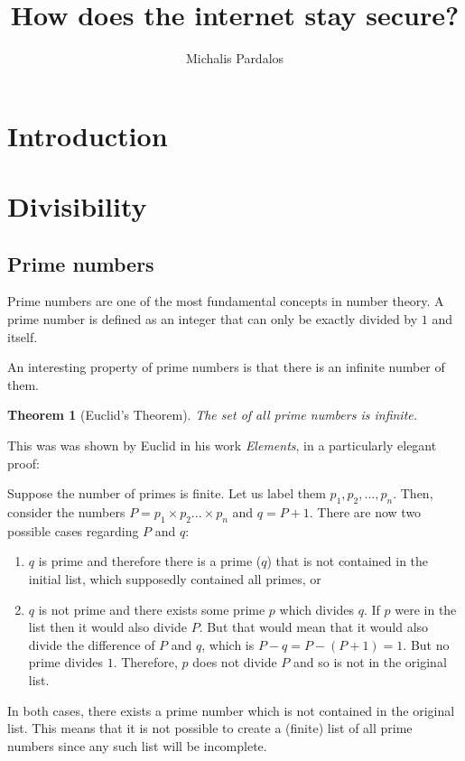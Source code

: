 \documentclass[12pt, titlepage]{article}
\title{How does the internet stay secure?}
\author{Michalis Pardalos}
\date{}
\newtheorem{theorem}{Theorem}
\begin{document}
\maketitle

\tableofcontents

\section{Introduction}

\section{Divisibility}
    \subsection{Prime numbers}
    Prime numbers are one of the most fundamental concepts in number theory. A
    prime number is defined as an integer that can only be exactly divided by
    $1$ and itself.

    An interesting property of prime numbers is that there is an infinite number
    of them. 
    \begin{theorem}[Euclid's Theorem]
        The set of all prime numbers is infinite.
    \end{theorem}
%
    This was was shown by Euclid in his work \emph{Elements}, in a
    particularly elegant proof:

    Suppose the number of primes is finite. Let us label them $p_1, p_2, ...,
    p_n$. Then, consider the numbers $P = p_1\times p_2 ... \times p_n$ and 
    $q = P + 1$. There are now two possible cases regarding $P$ and $q$:
    \begin{enumerate}[label=\alph*)]
        \item $q$ is prime and therefore there is a prime ($q$) that is not
            contained in the initial list, which supposedly contained all
            primes, or
        \item $q$ is not prime and there exists some prime $p$ which divides
            $q$. If $p$ were in the list then it would also divide $P$. But that
            would mean that it would also divide the difference of $P$ and $q$,
            which is $P - q = P - (P + 1) = 1$. But no prime divides $1$.
            Therefore, $p$ does not divide $P$ and so is not in the original
            list.
    \end{enumerate}
    In both cases, there exists a prime number which is not contained in the
    original list. This means that it is not possible to create a (finite) list
    of all prime numbers since any such list will be incomplete.
        
\end{document}
